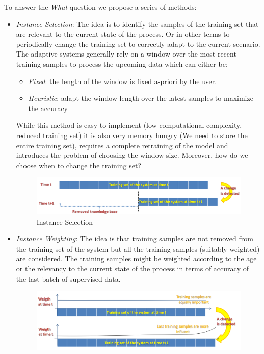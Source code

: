 \documentclass{article}
\begin{document}
    To answer the \emph{What} question we propose a series of methods:
    \begin{itemize}
      \item \emph{Instance Selection}: The idea is to identify the samples of the training set that are relevant to the current state of the process. Or in other terms to periodically change the training set to correctly adapt to the current scenario. The adaptive systems generally rely on a 
      window over the most recent training samples to process the upcoming data which can either be:
      \begin{itemize}
        \item \emph{Fixed}: the length of the window is fixed a-priori by the user.
        \item \emph{Heuristic}: adapt the window length over the latest samples to maximize the accuracy
      \end{itemize}
      While this method is easy to implement (low computational-complexity, reduced training set) it is also very memory hungry (We need to store the entire training set), requires a complete retraining of the model and introduces the problem of choosing the window size. Moreover, how do we choose when to change the training set?
      \begin{figure}[H]
        \includegraphics[scale=0.35]{../Images/InstanceSelection.png}
        \centering
        \caption{Instance Selection}
      \end{figure}
      \item \emph{Instance Weighting}: The idea is that training samples are not removed from the training set of the system but all the training samples (suitably weighted) are considered. The training samples might be weighted according to the age or
      the relevancy to the current state of the process in terms of accuracy of the last batch of supervised data.
      \begin{figure}[H]
        \includegraphics[scale=0.35]{../Images/InstanceWeight.png}

\end{figure}
\end{itemize}
\end{document}

